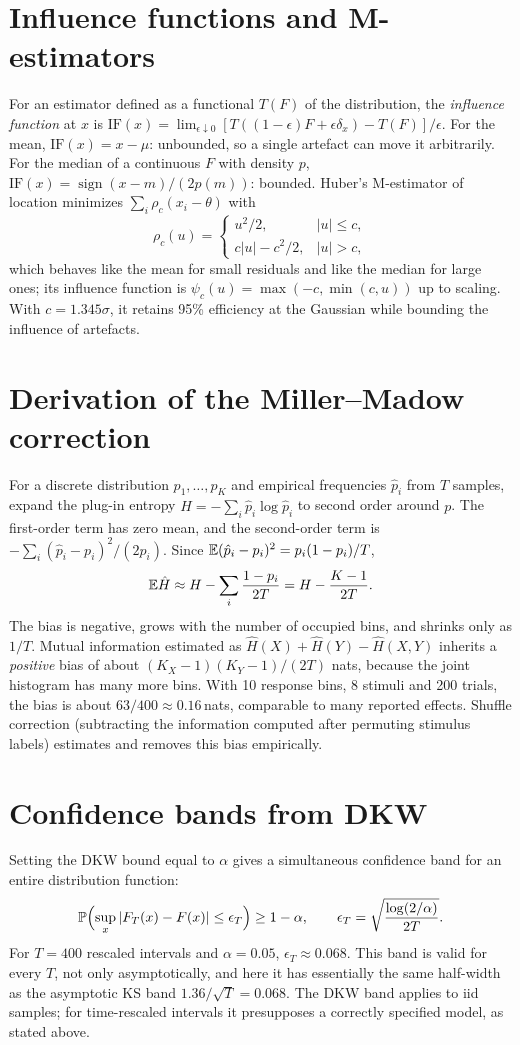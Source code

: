 \section{Influence functions and M-estimators}
For an estimator defined as a functional $T(F)$ of the distribution, the
\emph{influence function} at $x$ is
$\mathrm{IF}(x)=\lim_{\epsilon\downarrow0}[T((1-\epsilon)F+\epsilon\delta_x)-T(F)]/\epsilon$.
For the mean, $\mathrm{IF}(x)=x-\mu$: unbounded, so a single artefact can
move it arbitrarily. For the median of a continuous $F$ with density $p$,
$\mathrm{IF}(x)=\operatorname{sign}(x-m)/(2p(m))$: bounded. Huber's
M-estimator of location minimizes $\sum_i\rho_c(x_i-\theta)$ with
\[
\rho_c(u)=\begin{cases}u^2/2,&|u|\le c,\\c|u|-c^2/2,&|u|>c,\end{cases}
\]
which behaves like the mean for small residuals and like the median for
large ones; its influence function is $\psi_c(u)=\max(-c,\min(c,u))$ up
to scaling. With $c=1.345\sigma$, it retains 95\% efficiency at the
Gaussian while bounding the influence of artefacts.

\section{Derivation of the Miller--Madow correction}
For a discrete distribution $p_1,\ldots,p_K$ and empirical frequencies
$\hat p_i$ from $T$ samples, expand the plug-in entropy
$\hat H=-\sum_i\hat p_i\log\hat p_i$ to second order around $p$. The
first-order term has zero mean, and the second-order term is
$-\sum_i(\hat p_i-p_i)^2/(2p_i)$. Since $\mathbb{E}(\hat p_i-p_i)^2=p_i(1-p_i)/T$,
\[
\mathbb{E}\hat H\approx H-\sum_i\frac{1-p_i}{2T}=H-\frac{K-1}{2T}.
\]
The bias is negative, grows with the number of occupied bins, and
shrinks only as $1/T$. Mutual information estimated as
$\hat H(X)+\hat H(Y)-\hat H(X,Y)$ inherits a \emph{positive} bias of about
$(K_X-1)(K_Y-1)/(2T)$ nats, because the joint histogram has many more
bins. With 10 response bins, 8 stimuli and 200 trials, the bias is about
$63/400\approx0.16$\,nats, comparable to many reported effects. Shuffle
correction (subtracting the information computed after permuting
stimulus labels) estimates and removes this bias empirically.

\section{Confidence bands from DKW}
Setting the DKW bound equal to $\alpha$ gives a simultaneous confidence
band for an entire distribution function:
\[
\mathbb{P}\Bigl(\sup_x|F_T(x)-F(x)|\le\epsilon_T\Bigr)\ge1-\alpha,\qquad
\epsilon_T=\sqrt{\frac{\log(2/\alpha)}{2T}}.
\]
For $T=400$ rescaled intervals and $\alpha=0.05$, $\epsilon_T\approx0.068$.
This band is valid for every $T$, not only asymptotically, and here it
has essentially the same half-width as the asymptotic KS band
$1.36/\sqrt T=0.068$. The DKW band applies to iid samples; for time-rescaled intervals
it presupposes a correctly specified model, as stated above.

